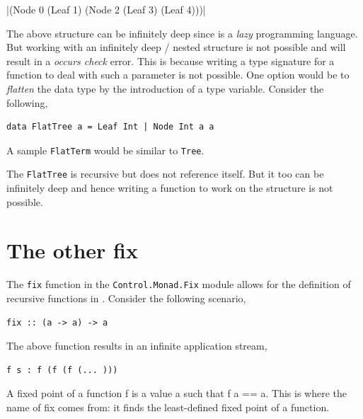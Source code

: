 \documentclass[thesis-solanki.tex]{subfiles}
\begin{document}
|(Node 0 (Leaf 1) (Node 2 (Leaf 3) (Leaf 4)))|

The above structure can be infinitely deep since  is a \textit{lazy} programming language. But working with an infinitely deep / nested 
structure is not possible and will result in a \textit{occurs check} error. This is because writing a type signature for a function to deal with such a
parameter is not possible. One option would be to \textit{flatten} the data type by the introduction of a type variable. Consider the following,

\begin{verbatim}
data FlatTree a = Leaf Int | Node Int a a
\end{verbatim}  

A sample \texttt{FlatTerm} would be similar to \texttt{Tree}. 

The \texttt{FlatTree} is recursive but does not reference itself. But it too can be infinitely deep and hence writing a function to work on the structure
is not possible.  

\section{The other fix}

The \texttt{fix} function in the \texttt{Control.Monad.Fix} module allows for the definition of recursive functions in . Consider the 
following scenario,

\begin{verbatim}
fix :: (a -> a) -> a
\end{verbatim}
The above function results in an infinite application stream,

\begin{verbatim}
f s : f (f (f (... )))
\end{verbatim} 

A fixed point of a function f is a value a such that f a == a. This is where the name of fix comes from: it finds the least-defined fixed 
point of a function.
\end{document}
